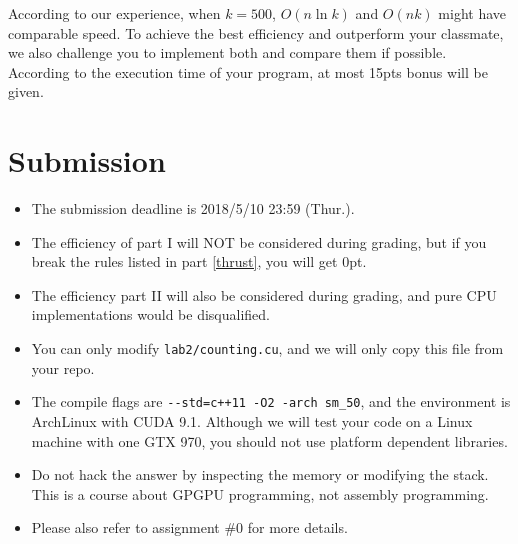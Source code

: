 \documentclass[12pt,a4paper]{article}
\renewcommand{\_}{\textscale{.5}{\textunderscore}}
\begin{document}
According to our experience, when $k=500$, $O(n\ln k)$ and $O(nk)$
might have comparable speed. To achieve the best efficiency and
outperform your classmate, we also challenge you to implement both and
compare them if possible.
According to the execution time of your program,
at most 15pts bonus will be given.

\section{Submission}

\begin{itemize}
\item The submission deadline is 2018/5/10 23:59 (Thur.).
\item The efficiency of part I will NOT be considered during grading, but if you
break the rules listed in part \ref{thrust}, you will get 0pt.
\item The efficiency part II will also be considered during grading, and pure CPU implementations would be disqualified.
\item You can only modify \verb+lab2/counting.cu+, and we will only copy this file from your repo.
\item The compile flags are \verb|--std=c++11 -O2 -arch sm_50|, and the environment is ArchLinux with CUDA 9.1. Although we will test your code on a Linux machine with one GTX 970, you should not use platform dependent libraries.
\item Do not hack the answer by inspecting the memory or modifying the stack. This is a course about GPGPU programming, not assembly programming.
\item Please also refer to assignment \#0 for more details.
\end{itemize}
\end{document}
